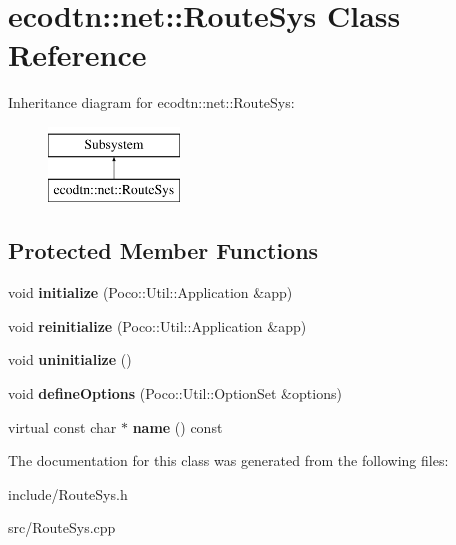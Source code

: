 \hypertarget{classecodtn_1_1net_1_1RouteSys}{}\section{ecodtn\+:\+:net\+:\+:Route\+Sys Class Reference}
\label{classecodtn_1_1net_1_1RouteSys}
Inheritance diagram for ecodtn\+:\+:net\+:\+:Route\+Sys\+:\begin{figure}[H]
\begin{center}
\leavevmode
\includegraphics[height=2.000000cm]{classecodtn_1_1net_1_1RouteSys}
\end{center}
\end{figure}
\subsection*{Protected Member Functions}
\begin{DoxyCompactItemize}
\item 
\mbox{\label{classecodtn_1_1net_1_1RouteSys_ae8266354491d2c02aa1663a4b38b87d8}} 
void {\bfseries initialize} (Poco\+::\+Util\+::\+Application \&app)
\item 
\mbox{\label{classecodtn_1_1net_1_1RouteSys_a3ef4de08f4b5b0b235964c36eadf5a10}} 
void {\bfseries reinitialize} (Poco\+::\+Util\+::\+Application \&app)
\item 
\mbox{\label{classecodtn_1_1net_1_1RouteSys_ab34717e21e7a47f18864c951f2dbf360}} 
void {\bfseries uninitialize} ()
\item 
\mbox{\label{classecodtn_1_1net_1_1RouteSys_a9ea4e14eff633e8a0f2bd97e96cc8781}} 
void {\bfseries define\+Options} (Poco\+::\+Util\+::\+Option\+Set \&options)
\item 
\mbox{\label{classecodtn_1_1net_1_1RouteSys_af2a0413934ca1984a89ccceb322e4fff}} 
virtual const char $\ast$ {\bfseries name} () const
\end{DoxyCompactItemize}


The documentation for this class was generated from the following files\+:\begin{DoxyCompactItemize}
\item 
include/Route\+Sys.\+h\item 
src/Route\+Sys.\+cpp\end{DoxyCompactItemize}
